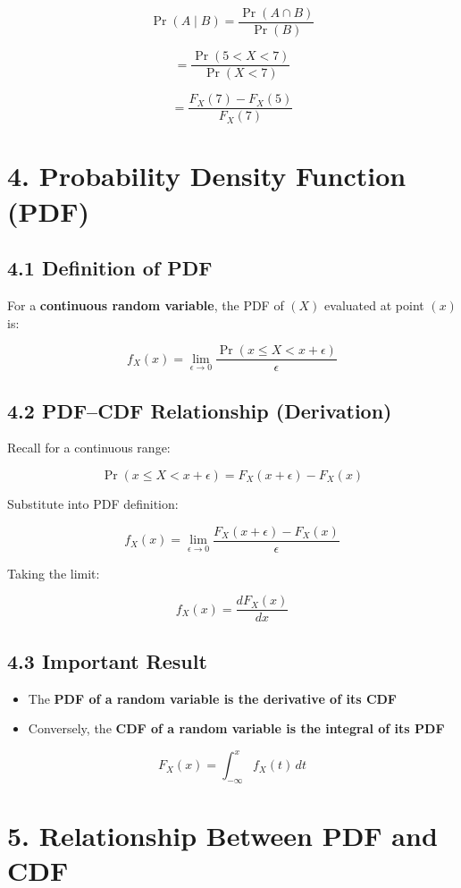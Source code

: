 \documentclass[12pt]{article}
\begin{document}
\[
\Pr(A \mid B) = \frac{\Pr(A \cap B)}{\Pr(B)}
\]

\[
= \frac{\Pr(5 < X < 7)}{\Pr(X < 7)}
\]

\[
= \frac{F_X(7) - F_X(5)}{F_X(7)}
\]

\section*{4. Probability Density Function (PDF)}

\subsection*{4.1 Definition of PDF}

For a \textbf{continuous random variable}, the PDF of $(X)$ evaluated at point $(x)$ is:

\[
f_X(x) = \lim_{\epsilon \to 0} \frac{\Pr(x \le X < x + \epsilon)}{\epsilon}
\]

\subsection*{4.2 PDF--CDF Relationship (Derivation)}

Recall for a continuous range:

\[
\Pr(x \le X < x + \epsilon) = F_X(x + \epsilon) - F_X(x)
\]

Substitute into PDF definition:

\[
f_X(x) = \lim_{\epsilon \to 0} \frac{F_X(x + \epsilon) - F_X(x)}{\epsilon}
\]

Taking the limit:

\[
\boxed{f_X(x) = \frac{dF_X(x)}{dx}}
\]

\subsection*{4.3 Important Result}

\begin{itemize}
\item The \textbf{PDF of a random variable is the derivative of its CDF}
\item Conversely, the \textbf{CDF of a random variable is the integral of its PDF}
\end{itemize}

\[
F_X(x) = \int_{-\infty}^{x} f_X(t)\,dt
\]

\section*{5. Relationship Between PDF and CDF}
\end{document}

